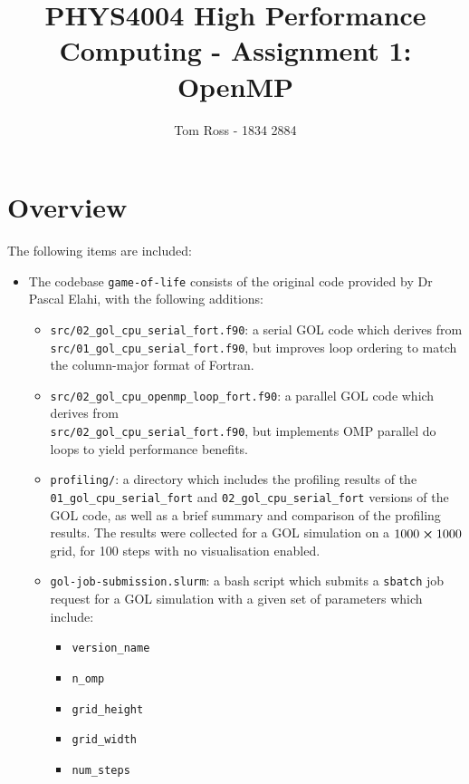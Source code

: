\documentclass[draft]{article}
\title{PHYS4004 High Performance Computing - Assignment 1: OpenMP}
\author{Tom Ross - 1834 2884}
\date{}
\begin{document}
\section{Overview}
\label{sec:Overview}

The following items are included:
\begin{itemize}
\item The codebase \lstinline{game-of-life} consists of the original code
  provided by Dr Pascal Elahi, with the following additions:
  \begin{itemize}
  \item \lstinline{src/02_gol_cpu_serial_fort.f90}: a serial GOL code which
    derives from \\ \lstinline{src/01_gol_cpu_serial_fort.f90}, but improves
    loop ordering to match the column-major format of Fortran.

  \item \lstinline{src/02_gol_cpu_openmp_loop_fort.f90}: a parallel GOL code which
    derives from \\ \lstinline{src/02_gol_cpu_serial_fort.f90}, but implements
    OMP parallel do loops to yield performance benefits.

  \item \lstinline{profiling/}: a directory which includes the profiling results
    of the \\ \lstinline{01_gol_cpu_serial_fort} and
    \lstinline{02_gol_cpu_serial_fort} versions of the GOL code, as well as a
    brief summary and comparison of the profiling results.
    The results were collected for a GOL simulation on a $1000\cross1000$ grid,
    for 100 steps with no visualisation enabled.

  \item \lstinline{gol-job-submission.slurm}: a bash script which submits a
    \lstinline{sbatch} job request for a GOL simulation with a given set of
    parameters which include:
    \begin{itemize}
    \item \lstinline{version_name}

    \item \lstinline{n_omp}

    \item \lstinline{grid_height}

    \item \lstinline{grid_width}

    \item \lstinline{num_steps}


\end{itemize}
\end{itemize}
\end{itemize}
\end{document}
